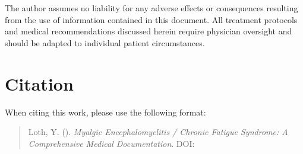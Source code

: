 The author assumes no liability for any adverse effects or consequences resulting from the use of information contained in this document. All treatment protocols and medical recommendations discussed herein require physician oversight and should be adapted to individual patient circumstances.

\section*{Citation}

When citing this work, please use the following format:

\begin{quote}
Loth, Y. (\the\year). \textit{Myalgic Encephalomyelitis / Chronic Fatigue Syndrome: A Comprehensive Medical Documentation}. DOI: \MECFSPaperDoiHref{}
\end{quote}

